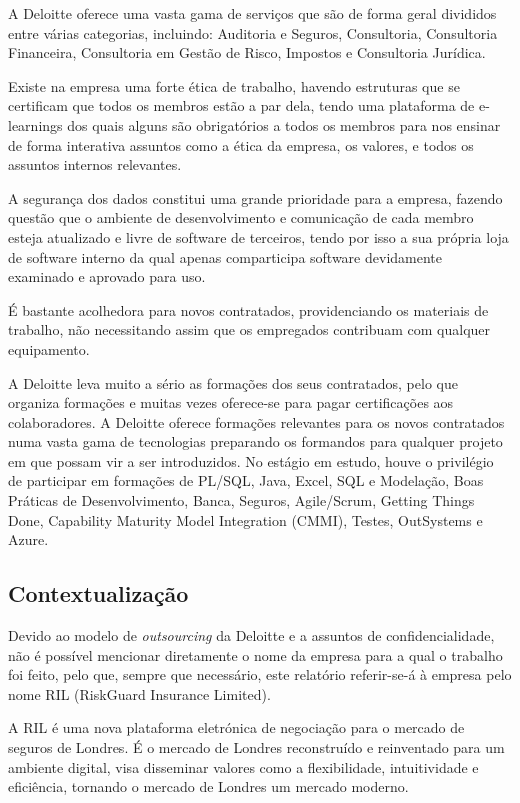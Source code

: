         A Deloitte oferece uma vasta gama de serviços que são de forma geral divididos entre várias categorias, incluindo: Auditoria e Seguros, Consultoria, Consultoria Financeira, Consultoria em Gestão de Risco, Impostos e Consultoria Jurídica.
        
        Existe na empresa uma forte ética de trabalho, havendo estruturas que se certificam que todos os membros estão a par dela, tendo uma plataforma de e-learnings dos quais alguns são obrigatórios a todos os membros para nos ensinar de forma interativa assuntos como a ética da empresa, os valores, e todos os assuntos internos relevantes. 
    
        A segurança dos dados constitui uma grande prioridade para a empresa, fazendo questão que o ambiente de desenvolvimento e comunicação de cada membro esteja atualizado e livre de software de terceiros, tendo por isso a sua própria loja de software interno da qual apenas comparticipa software devidamente examinado e aprovado para uso.
    
        É bastante acolhedora para novos contratados, providenciando os materiais de trabalho, não necessitando assim que os empregados contribuam com qualquer equipamento.
        
        A Deloitte leva muito a sério as formações dos seus contratados, pelo que organiza formações e muitas vezes oferece-se para pagar certificações aos colaboradores. A Deloitte oferece formações relevantes para os novos contratados numa vasta gama de tecnologias preparando os formandos para qualquer projeto em que possam vir a ser introduzidos. No estágio em estudo, houve o privilégio de participar em formações de PL/SQL, Java, Excel, SQL e Modelação, Boas Práticas de Desenvolvimento, Banca, Seguros, Agile/Scrum, Getting Things Done, Capability Maturity Model Integration (CMMI), Testes, OutSystems e Azure.
    
    \subsection{Contextualização}\label{subsec:contextualizacao}

        Devido ao modelo de \textit{outsourcing} da Deloitte e a assuntos de confidencialidade, não é possível mencionar diretamente o nome da empresa para a qual o trabalho foi feito, pelo que, sempre que necessário, este relatório referir-se-á à empresa pelo nome RIL (RiskGuard Insurance Limited).
    
        A RIL é uma nova plataforma eletrónica de negociação para o mercado de seguros de Londres. É o mercado de Londres reconstruído e reinventado para um ambiente digital, visa disseminar valores como a flexibilidade, intuitividade e eficiência, tornando o mercado de Londres um mercado moderno.

